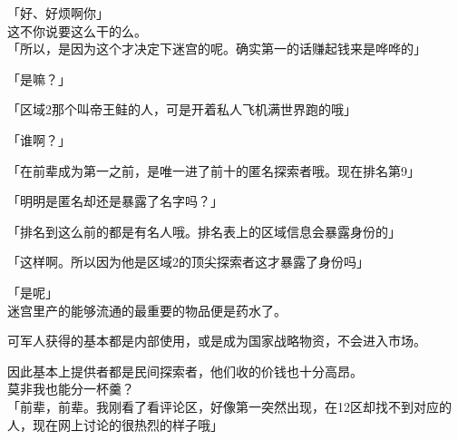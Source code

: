 「好、好烦啊你」\\

这不你说要这么干的么。\\

「所以，是因为这个才决定下迷宫的呢。确实第一的话赚起钱来是哗哗的」

「是嘛？」

「区域2那个叫帝王鲑的人，可是开着私人飞机满世界跑的哦」

「谁啊？」

「在前辈成为第一之前，是唯一进了前十的匿名探索者哦。现在排名第9」

「明明是匿名却还是暴露了名字吗？」

「排名到这么前的都是有名人哦。排名表上的区域信息会暴露身份的」

「这样啊。所以因为他是区域2的顶尖探索者这才暴露了身份吗」

「是呢」\\

迷宫里产的能够流通的最重要的物品便是药水了。

可军人获得的基本都是内部使用，或是成为国家战略物资，不会进入市场。

因此基本上提供者都是民间探索者，他们收的价钱也十分高昂。\\

莫非我也能分一杯羹？\\

「前辈，前辈。我刚看了看评论区，好像第一突然出现，在12区却找不到对应的人，现在网上讨论的很热烈的样子哦」

